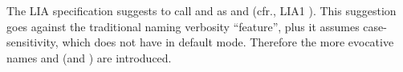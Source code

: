 \documentclass[../Comparisons-Predicates.tex]{subfiles}
\begin{document}

    \DNotes{}

    The LIA specification suggests to call  and 
    as  and  (cfr., LIA1
    \cite{2012:LIA1}). This suggestion goes against the traditional \CL{}
    naming verbosity ``feature'', plus it assumes case-sensitivity, which
    \CL{} does not have in default mode. Therefore the more evocative
    names  and  (and ) are
    introduced.
\end{document}
